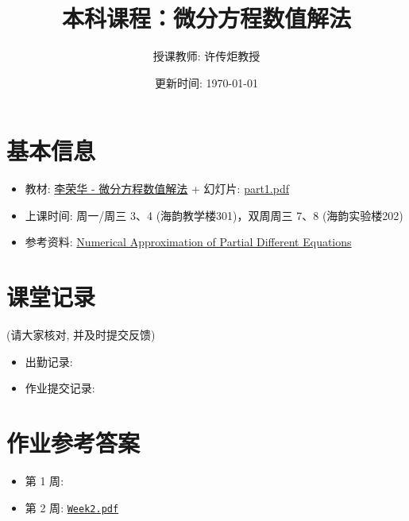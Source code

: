 \documentclass[a4paper,11pt]{article}
\title{本科课程：微分方程数值解法}
\author{授课教师: 许传炬教授}
\date{更新时间: \today}
\begin{document}
\maketitle

\vspace{-3em}

\section*{\large 基本信息}
\vspace{-1em}

\begin{itemize}
\item 教材: \href{https://wanghuaijin.github.io/assets/numDEs/LiRonghua.pdf}{李荣华 - 微分方程数值解法} + 幻灯片: \href{https://wanghuaijin.github.io/assets/numDEs/part1.pdf}{part1.pdf}
\vspace{-1em}
\item 上课时间: 周一/周三 3、4 (海韵教学楼301)，双周周三 7、8 (海韵实验楼202)
\vspace{-1em}
\item 参考资料: \href{https://wanghuaijin.github.io/assets/numDEs/Alfio1994.pdf}{Numerical Approximation of Partial Different Equations}
\end{itemize}

\vspace{-2em}

\section*{\large 课堂记录}
\vspace{-1em}

(请大家核对, 并及时提交反馈)

\vspace{-1em}
\begin{itemize}
\item 出勤记录:
\vspace{-1em}
\item 作业提交记录:
\end{itemize}



\vspace{-2em}

\section*{\large 作业参考答案}
\vspace{-1em}

\begin{itemize}
    \item {第 1 周}:   
    \vspace{-1em}
    \item {第 2 周}: \href{https://wanghuaijin.github.io/assets/numDEs/exercises/exercise2.pdf}{\texttt{Week2.pdf}}
    \vspace{-1em}
\end{itemize}
\end{document}
